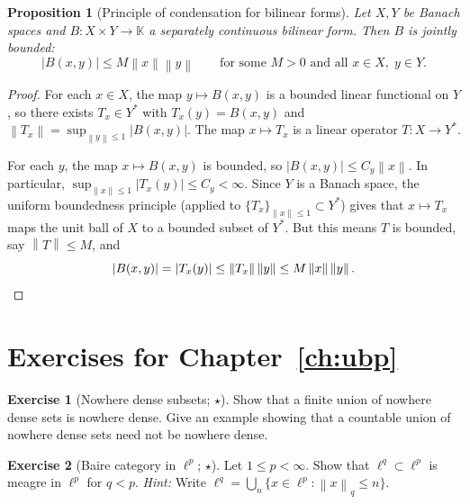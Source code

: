 \documentclass[a4paper,12pt]{book}
\newcommand{\K}{\mathbb{K}}
\newcommand{\norm}[1]{\left\| #1 \right\|}
\newcommand{\abs}[1]{\left| #1 \right|}
\theoremstyle{definition}
\newtheorem{exercise}{Exercise}[chapter]
\theoremstyle{plain}
\newtheorem{proposition}[definition]{Proposition}
\theoremstyle{remark}
\begin{document}
\begin{proposition}[Principle of condensation for bilinear forms]%
\label{prop:bilinear-ubp}
Let $X, Y$ be Banach spaces and $B \colon X \times Y \to \K$ a separately
continuous bilinear form. Then $B$ is jointly bounded:
\[
  \abs{B(x,y)} \leq M \norm{x}\norm{y}
  \qquad \text{for some } M > 0 \text{ and all } x \in X,\; y \in Y.
\]
\end{proposition}

\begin{proof}
For each $x \in X$, the map $y \mapsto B(x,y)$ is a bounded linear functional on
$Y$, so there exists $T_x \in Y^*$ with $T_x(y) = B(x,y)$ and
$\norm{T_x} = \sup_{\norm{y}\leq 1} \abs{B(x,y)}$. The map $x \mapsto T_x$ is
a linear operator $T \colon X \to Y^*$.

For each $y$, the map $x \mapsto B(x,y)$ is bounded, so $\abs{B(x,y)} \leq
C_y \norm{x}$. In particular, $\sup_{\norm{x}\leq 1}\abs{T_x(y)} \leq C_y < \infty$.
Since $Y$ is a Banach space, the uniform boundedness principle (applied to
$\{T_x\}_{\norm{x}\leq 1} \subset Y^*$) gives that $x \mapsto T_x$ maps the unit
ball of $X$ to a bounded subset of $Y^*$. But this means $T$ is bounded, say
$\norm{T} \leq M$, and
\[
  \abs{B(x,y)} = \abs{T_x(y)} \leq \norm{T_x}\norm{y} \leq M\norm{x}\norm{y}.
  \qedhere
\]
\end{proof}

\section{Exercises for Chapter~\ref{ch:ubp}}\label{sec:ubp-exercises}

\begin{exercise}[Nowhere dense subsets; $\star$]\label{ex:nowhere-dense-union}
Show that a finite union of nowhere dense sets is nowhere dense. Give an example
showing that a countable union of nowhere dense sets need not be nowhere dense.
\end{exercise}

\begin{exercise}[Baire category in $\ell^p$; $\star$]\label{ex:baire-ell-p}
Let $1 \leq p < \infty$. Show that $\ell^q \subset \ell^p$ is meagre in $\ell^p$
for $q < p$. \textit{Hint:} Write $\ell^q = \bigcup_n \{x \in \ell^p :
\norm{x}_q \leq n\}$.
\end{exercise}
\end{document}
